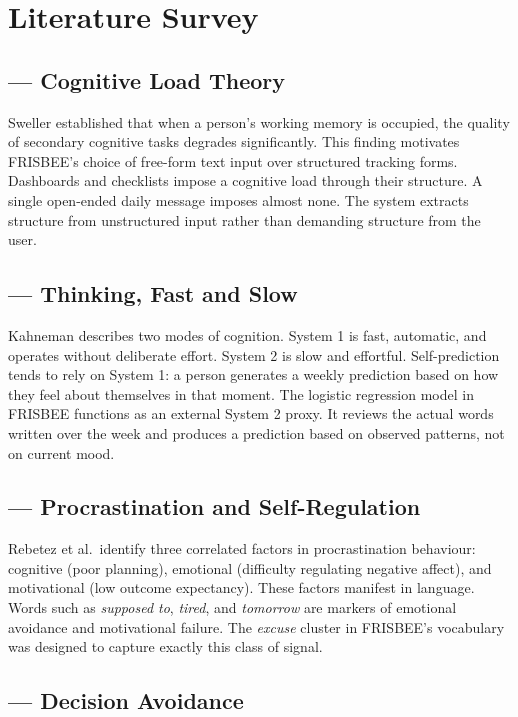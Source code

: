 \documentclass[11pt, a4paper]{report}
\begin{document}
\section{Literature Survey}

\subsection{\citet{sweller1988} --- Cognitive Load Theory}

Sweller established that when a person's working memory is occupied, the
quality of secondary cognitive tasks degrades significantly. This finding
motivates FRISBEE's choice of free-form text input over structured tracking
forms. Dashboards and checklists impose a cognitive load through their
structure. A single open-ended daily message imposes almost none. The system
extracts structure from unstructured input rather than demanding structure
from the user.

\subsection{\citet{kahneman2011} --- Thinking, Fast and Slow}

Kahneman describes two modes of cognition. System 1 is fast, automatic,
and operates without deliberate effort. System 2 is slow and effortful.
Self-prediction tends to rely on System 1: a person generates a weekly
prediction based on how they feel about themselves in that moment. The
logistic regression model in FRISBEE functions as an external System 2
proxy. It reviews the actual words written over the week and produces a
prediction based on observed patterns, not on current mood.

\subsection{\citet{rebetez2015} --- Procrastination and Self-Regulation}

Rebetez et al.\ identify three correlated factors in procrastination
behaviour: cognitive (poor planning), emotional (difficulty regulating
negative affect), and motivational (low outcome expectancy). These factors
manifest in language. Words such as \textit{supposed to}, \textit{tired},
and \textit{tomorrow} are markers of emotional avoidance and motivational
failure. The \textit{excuse} cluster in FRISBEE's vocabulary was designed
to capture exactly this class of signal.

\subsection{\citet{anderson2003} --- Decision Avoidance}
\end{document}
